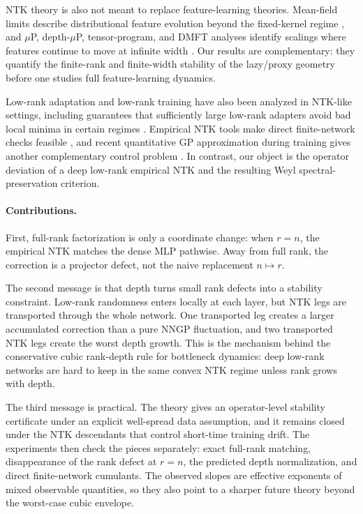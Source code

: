 \documentclass{article}
\begin{document}
NTK theory is also not meant to replace feature-learning theories. Mean-field limits describe distributional feature evolution beyond the fixed-kernel regime \citep{MeiMontanariNguyen2018,ChizatBach2018,RotskoffVandenEijnden2018}, and \(\mu\)P, depth-\(\mu\)P, tensor-program, and DMFT analyses identify scalings where features continue to move at infinite width \citep{Yang2022MuP,YangDepthMuP2024,BordelonPehlevan2022}. Our results are complementary: they quantify the finite-rank and finite-width stability of the lazy/proxy geometry before one studies full feature-learning dynamics.

Low-rank adaptation and low-rank training have also been analyzed in NTK-like settings, including guarantees that sufficiently large low-rank adapters avoid bad local minima in certain regimes \citep{JangLeeRyu2024LoRA}. Empirical NTK tools make direct finite-network checks feasible \citep{Novak2022}, and recent quantitative GP approximation during training gives another complementary control problem \citep{MosigGarciaAgazziTrevisan2025}. In contrast, our object is the operator deviation of a deep low-rank empirical NTK and the resulting Weyl spectral-preservation criterion.

\paragraph{Contributions.}
First, full-rank factorization is only a coordinate change: when \(r=n\), the empirical NTK matches the dense MLP pathwise. Away from full rank, the correction is a projector defect, not the naive replacement \(n\mapsto r\).

The second message is that depth turns small rank defects into a stability constraint. Low-rank randomness enters locally at each layer, but NTK legs are transported through the whole network. One transported leg creates a larger accumulated correction than a pure NNGP fluctuation, and two transported NTK legs create the worst depth growth. This is the mechanism behind the conservative cubic rank-depth rule for bottleneck dynamics: deep low-rank networks are hard to keep in the same convex NTK regime unless rank grows with depth.

The third message is practical. The theory gives an operator-level stability certificate under an explicit well-spread data assumption, and it remains closed under the NTK descendants that control short-time training drift. The experiments then check the pieces separately: exact full-rank matching, disappearance of the rank defect at \(r=n\), the predicted depth normalization, and direct finite-network cumulants. The observed slopes are effective exponents of mixed observable quantities, so they also point to a sharper future theory beyond the worst-case cubic envelope.
\end{document}
